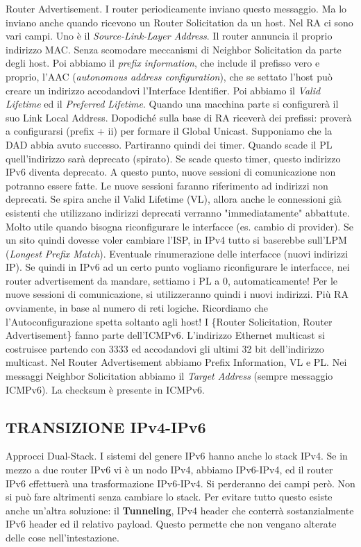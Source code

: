 Router Advertisement. I router periodicamente inviano questo messaggio. Ma lo inviano anche quando ricevono un Router Solicitation da un host. Nel RA ci sono vari campi. Uno è il \textit{Source-Link-Layer Address}. Il router annuncia il proprio indirizzo MAC. Senza scomodare meccanismi di Neighbor Solicitation da parte degli host. Poi abbiamo il \textit{prefix information}, che include il prefisso vero e proprio, l'AAC (\textit{autonomous address configuration}), che se settato l'host può creare un indirizzo accodandovi l'Interface Identifier. Poi abbiamo il \textit{Valid Lifetime} ed il \textit{Preferred Lifetime}. Quando una macchina parte si configurerà il suo Link Local Address. Dopodiché sulla base di RA riceverà dei prefissi: proverà a configurarsi (prefix + ii) per formare il Global Unicast. Supponiamo che la DAD abbia avuto successo. Partiranno quindi dei timer. Quando scade il PL quell'indirizzo sarà deprecato (spirato). Se scade questo timer, questo indirizzo IPv6 diventa deprecato. A questo punto, nuove sessioni di comunicazione non potranno essere fatte. Le nuove sessioni faranno riferimento ad indirizzi non deprecati. Se spira anche il Valid Lifetime (VL), allora anche le connessioni già esistenti che utilizzano indirizzi deprecati verranno "immediatamente" abbattute. Molto utile quando bisogna riconfigurare le interfacce (es. cambio di provider). Se un sito quindi dovesse voler cambiare l'ISP, in IPv4 tutto si baserebbe sull'LPM (\textit{Longest Prefix Match}). Eventuale rinumerazione delle interfacce (nuovi indirizzi IP). Se quindi in IPv6 ad un certo punto vogliamo riconfigurare le interfacce, nei router advertisement da mandare, settiamo i PL a 0, automaticamente! Per le nuove sessioni di comunicazione, si utilizzeranno quindi i nuovi indirizzi. Più RA ovviamente, in base al numero di reti logiche. Ricordiamo che l'Autoconfigurazione spetta soltanto agli host! I \{Router Solicitation, Router Advertisement\} fanno parte dell'ICMPv6. L'indirizzo Ethernet multicast si costruisce partendo con 3333 ed accodandovi gli ultimi 32 bit dell'indirizzo multicast. Nel Router Advertisement abbiamo Prefix Information, VL e PL. Nei messaggi Neighbor Solicitation abbiamo il \textit{Target Address} (sempre messaggio ICMPv6). La checksum è presente in ICMPv6.

\subsection{TRANSIZIONE IPv4-IPv6}

Approcci Dual-Stack. I sistemi del genere IPv6 hanno anche lo stack IPv4. Se in mezzo a due router IPv6 vi è un nodo IPv4, abbiamo IPv6-IPv4, ed il router IPv6 effettuerà una trasformazione IPv6-IPv4. Si perderanno dei campi però. Non si può fare altrimenti senza cambiare lo stack. Per evitare tutto questo esiste anche un'altra soluzione: il \textbf{Tunneling}, IPv4 header che conterrà sostanzialmente IPv6 header ed il relativo payload. Questo permette che non vengano alterate delle cose nell'intestazione.


